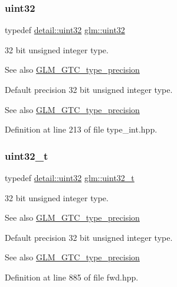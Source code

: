 \subsubsection{\texorpdfstring{uint32}{uint32}}
{\footnotesize\ttfamily typedef \mbox{\hyperlink{namespaceglm_1_1detail_ade6cfbf377022aaa391af8cd50489222}{detail\+::uint32}} \mbox{\hyperlink{group__gtc__type__precision_ga202b6a53c105fcb7e531f9b443518451}{glm\+::uint32}}}

32 bit unsigned integer type. \begin{DoxySeeAlso}{See also}
\mbox{\hyperlink{group__gtc__type__precision}{G\+L\+M\+\_\+\+G\+T\+C\+\_\+type\+\_\+precision}}
\end{DoxySeeAlso}
Default precision 32 bit unsigned integer type. \begin{DoxySeeAlso}{See also}
\mbox{\hyperlink{group__gtc__type__precision}{G\+L\+M\+\_\+\+G\+T\+C\+\_\+type\+\_\+precision}} 
\end{DoxySeeAlso}


Definition at line 213 of file type\+\_\+int.\+hpp.

\mbox{\label{group__gtc__type__precision_ga822ca53a9ad412504532838906276a99}} 
\subsubsection{\texorpdfstring{uint32\_t}{uint32\_t}}
{\footnotesize\ttfamily typedef \mbox{\hyperlink{namespaceglm_1_1detail_ade6cfbf377022aaa391af8cd50489222}{detail\+::uint32}} \mbox{\hyperlink{group__gtc__type__precision_ga822ca53a9ad412504532838906276a99}{glm\+::uint32\+\_\+t}}}

32 bit unsigned integer type. \begin{DoxySeeAlso}{See also}
\mbox{\hyperlink{group__gtc__type__precision}{G\+L\+M\+\_\+\+G\+T\+C\+\_\+type\+\_\+precision}}
\end{DoxySeeAlso}
Default precision 32 bit unsigned integer type. \begin{DoxySeeAlso}{See also}
\mbox{\hyperlink{group__gtc__type__precision}{G\+L\+M\+\_\+\+G\+T\+C\+\_\+type\+\_\+precision}} 
\end{DoxySeeAlso}


Definition at line 885 of file fwd.\+hpp.

\mbox{\label{group__gtc__type__precision_gae3632bf9b37da66233d78930dd06378a}} 

